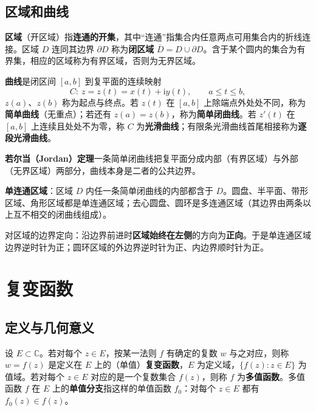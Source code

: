 \subsection{区域和曲线}
\textbf{区域}（开区域）指\textbf{连通的开集}，其中“连通”指集合内任意两点可用集合内的折线连接。区域 \(D\) 连同其边界 \(\partial D\) 称为\textbf{闭区域} \(\overline{D}=D\cup\partial D\)。含于某个圆内的集合为有界集，相应的区域称为有界区域，否则为无界区域。

\textbf{曲线}是闭区间 \([a,b]\) 到复平面的连续映射
\[
C:\ z=z(t)=x(t)+\mathrm{i}y(t),\qquad a\leqslant t\leqslant b,
\]
\(z(a)\)、\(z(b)\) 称为起点与终点。若 \(z(t)\) 在 \([a,b]\) 上除端点外处处不同，称为\textbf{简单曲线}（无重点）；若还有 \(z(a)=z(b)\)，称为\textbf{简单闭曲线}。若 \(z'(t)\) 在 \([a,b]\) 上连续且处处不为零，称 \(C\) 为\textbf{光滑曲线}；有限条光滑曲线首尾相接称为\textbf{逐段光滑曲线}。

\textbf{若尔当（Jordan）定理}\quad 一条简单闭曲线把复平面分成内部（有界区域）与外部（无界区域）两部分，曲线本身是二者的公共边界。

\textbf{单连通区域}：区域 \(D\) 内任一条简单闭曲线的内部都含于 \(D\)。圆盘、半平面、带形区域、角形区域都是单连通区域；去心圆盘、圆环是多连通区域（其边界由两条以上互不相交的闭曲线组成）。

对区域的边界定向：沿边界前进时\textbf{区域始终在左侧}的方向为\textbf{正向}。于是单连通区域边界逆时针为正；圆环区域的外边界逆时针为正、内边界顺时针为正。


\section{复变函数}

\subsection{定义与几何意义}
设 \(E\subset\mathbb{C}\)。若对每个 \(z\in E\)，按某一法则 \(f\) 有确定的复数 \(w\) 与之对应，则称 \(w=f(z)\) 是定义在 \(E\) 上的（单值）\textbf{复变函数}，\(E\) 为定义域，\(\{f(z): z\in E\}\) 为值域。若对每个 \(z\in E\) 对应的是一个复数集合 \(f(z)\)，则称 \(f\) 为\textbf{多值函数}。多值函数 \(f\) 在 \(E\) 上的\textbf{单值分支}指这样的单值函数 \(f_{0}\)：对每个 \(z\in E\) 都有 \(f_{0}(z)\in f(z)\)。

